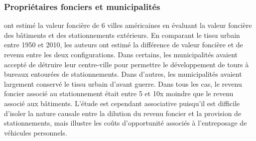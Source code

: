     \subsubsection{Propriétaires fonciers et municipalités}
      \textcite{Blanc:EffectsUrban:2014} ont estimé la valeur foncière de 6 villes américaines en évaluant la valeur foncière des bâtiments et des stationnements extérieurs. En comparant le tissu urbain entre 1950 et 2010, les auteurs ont estimé la différence de valeur foncière et de revenu entre les deux configurations. Dans certains, les municipalités avaient accepté de détruire leur centre-ville pour permettre le développement de tours à bureaux entourées de stationnements. Dans d'autres, les municipalités avaient largement conservé le tissu urbain d'avant guerre. Dans tous les cas, le revenu foncier associé au stationnement était entre 5 et 10x moindre que le revenu associé aux bâtiments. L'étude est cependant associative puisqu'il est difficile d'isoler la nature causale entre la dilution du revenu foncier et la provision de stationnements, mais illustre les coûts d'opportunité associés à l'entreposage de véhicules personnels. \par

